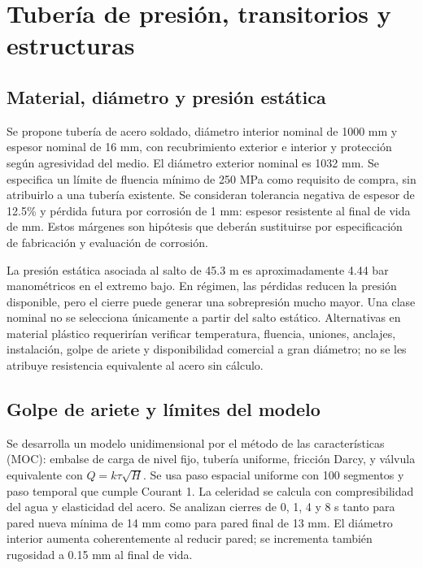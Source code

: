 \chapter{Tubería de presión, transitorios y estructuras}
\section{Material, diámetro y presión estática}
Se propone tubería de acero soldado, diámetro interior nominal de 1000 mm y espesor nominal de 16 mm, con recubrimiento exterior e interior y protección según agresividad del medio. El diámetro exterior nominal es 1032 mm. Se especifica un límite de fluencia mínimo de 250 MPa como requisito de compra, sin atribuirlo a una tubería existente. Se consideran tolerancia negativa de espesor de 12.5\% y pérdida futura por corrosión de 1 mm: espesor resistente al final de vida de  mm. Estos márgenes son hipótesis que deberán sustituirse por especificación de fabricación y evaluación de corrosión.

La presión estática asociada al salto de 45.3 m es aproximadamente 4.44 bar manométricos en el extremo bajo. En régimen, las pérdidas reducen la presión disponible, pero el cierre puede generar una sobrepresión mucho mayor. Una clase nominal no se selecciona únicamente a partir del salto estático. Alternativas en material plástico requerirían verificar temperatura, fluencia, uniones, anclajes, instalación, golpe de ariete y disponibilidad comercial a gran diámetro; no se les atribuye resistencia equivalente al acero sin cálculo.

\section{Golpe de ariete y límites del modelo}
Se desarrolla un modelo unidimensional por el método de las características (MOC): embalse de carga de nivel fijo, tubería uniforme, fricción Darcy, y válvula equivalente con \(Q=k\tau\sqrt{H}\). Se usa paso espacial uniforme con 100 segmentos y paso temporal que cumple Courant 1. La celeridad se calcula con compresibilidad del agua y elasticidad del acero. Se analizan cierres de 0, 1, 4 y 8 s tanto para pared nueva mínima de 14 mm como para pared final de 13 mm. El diámetro interior aumenta coherentemente al reducir pared; se incrementa también rugosidad a 0.15 mm al final de vida.

